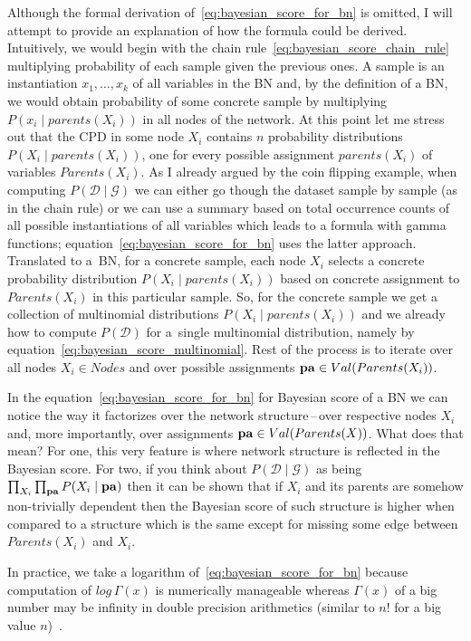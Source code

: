 \documentclass[english,cover]{fitthesis} %
\newcommand{\vars}[1]{{\bold{#1}}}         %
\begin{document}
Although the formal derivation of~\eqref{eq:bayesian_score_for_bn} is omitted, I will attempt to provide an explanation of how the formula could be derived. Intuitively, we would begin with the chain rule~\eqref{eq:bayesian_score_chain_rule} multiplying probability of each sample given the previous ones. A sample is an instantiation $x_1, \dots, x_k$ of all variables in the BN and, by the definition of a BN, we would obtain probability of some concrete sample by multiplying $P(x_i \mid parents(X_i))$ in all nodes of the network. At this point let me stress out that the CPD in some node $X_i$ contains $n$ probability distributions $P(X_i \mid parents(X_i))$, one for every possible assignment $parents(X_i)$ of variables $Parents(X_i)$. As I already argued by the coin flipping example, when computing $P(\mathcal{D} \mid \mathcal{G})$ we can either go though the dataset sample by sample (as in the chain rule) or we can use a summary based on total occurrence counts of all possible instantiations of all variables which leads to a formula with gamma functions; equation~\eqref{eq:bayesian_score_for_bn} uses the latter approach. Translated to a~BN, for a concrete sample, each node $X_i$ selects a concrete probability distribution $P(X_i \mid parents(X_i))$ based on concrete assignment to $Parents(X_i)$ in this particular sample. So, for the concrete sample we get a collection of multinomial distributions $P(X_i \mid parents(X_i))$ and we already how to compute $P(\mathcal{D})$ for a~single multinomial distribution, namely by equation~\eqref{eq:bayesian_score_multinomial}. Rest of the process is to iterate over all nodes $X_i \in Nodes$ and over possible assignments $\vars{pa} \in Val(Parents(X_i))$.

In the equation~\eqref{eq:bayesian_score_for_bn} for Bayesian score of a BN we can notice the way it factorizes over the network structure\,--\,over respective nodes $X_i$ and, more importantly, over assignments $\vars{pa} \in Val(Parents(X))$. What does that mean? For one, this very feature is where network structure is reflected in the Bayesian score. For two, if you think about $P(\mathcal{D} \mid \mathcal{G})$ as being $\prod_{X_i} \prod_{\vars{pa}} P(X_i \mid \vars{pa})$ then it can be shown that if $X_i$ and its parents are somehow non-trivially dependent then the Bayesian score of such structure is higher when compared to a structure which is the same except for missing some edge between $Parents(X_i)$ and $X_i$.


\medskip

In practice, we take a logarithm of~\eqref{eq:bayesian_score_for_bn} because computation of $log \, \Gamma(x)$ is numerically manageable whereas $\Gamma(x)$ of a big number may be infinity in double precision arithmetics (similar to $n!$ for a big value $n$)~\cite[p.~801]{pgm}.
\end{document}
